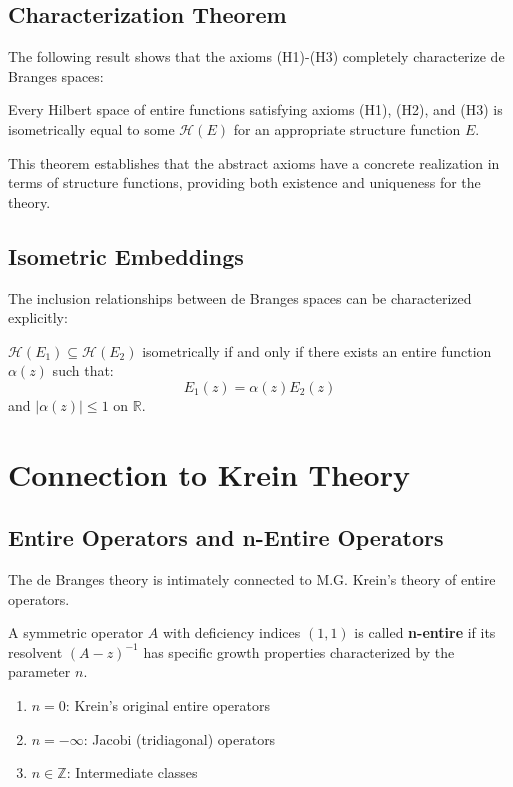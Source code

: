 \subsection{Characterization Theorem}

The following result shows that the axioms (H1)-(H3) completely characterize de Branges spaces:

\begin{theorem}
\label{thm:characterization}
Every Hilbert space of entire functions satisfying axioms (H1), (H2), and (H3) is isometrically equal to some $\mathcal{H}(E)$ for an appropriate structure function $E$.
\end{theorem}

This theorem establishes that the abstract axioms have a concrete realization in terms of structure functions, providing both existence and uniqueness for the theory.

\subsection{Isometric Embeddings}

The inclusion relationships between de Branges spaces can be characterized explicitly:

\begin{proposition}
$\mathcal{H}(E_1) \subseteq \mathcal{H}(E_2)$ isometrically if and only if there exists an entire function $\alpha(z)$ such that:
$$E_1(z) = \alpha(z)E_2(z)$$
and $|\alpha(z)| \leq 1$ on $\mathbb{R}$.
\end{proposition}

\section{Connection to Krein Theory}
\label{sec:krein-connection}

\subsection{Entire Operators and n-Entire Operators}

The de Branges theory is intimately connected to M.G. Krein's theory of entire operators.

\begin{definition}
A symmetric operator $A$ with deficiency indices $(1,1)$ is called \textbf{n-entire} if its resolvent $(A-z)^{-1}$ has specific growth properties characterized by the parameter $n$.
\begin{enumerate}
\item $n = 0$: Krein's original entire operators
\item $n = -\infty$: Jacobi (tridiagonal) operators  
\item $n \in \mathbb{Z}$: Intermediate classes
\end{enumerate}
\end{definition}

